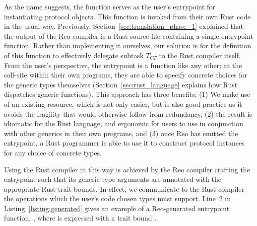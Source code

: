 As the name suggests, the  function serves as the user's entrypoint for instantiating protocol objects. This function is invoked from their own Rust code in the usual way. Previously, Section~\ref{sec:translation_phase_1} explained that the output of the Reo compiler is a Rust source file containing a single entrypoint function. Rather than implementing it ourselves, our solution is for the definition of this function to effectively delegate subtask $T_{CT}$ to the Rust compiler itself. From the user's perspective, the entrypoint is a function like any other; at the call-site within their own programs, they are able to specify concrete choices for the generic types themselves (Section~\ref{sec:rust_language} explains how Rust dispatches generic functions).
This approach has three benefits: (1) We make use of an existing resource, which is not only easier, but is also good practice as it avoids the fragility that would otherwise follow from redundancy, (2) the result is idiomatic for the Rust language, and ergonomic for users to use in conjunction with other generics in their own programs, and (3) once Reo has emitted the entrypoint, a Rust programmer is able to use it to construct protocol instances for any choice of concrete types.

Using the Rust compiler in this way is achieved by the Reo compiler crafting the entrypoint such that its generic type arguments are annotated with the appropriate Rust trait bounds. In effect, we communicate to the Rust compiler the operations which the user's code chosen types must support. Line~2 in Listing~\ref{listing:generated} gives an example of a Reo-generated entrypoint function, , where  is expressed with a trait bound .

